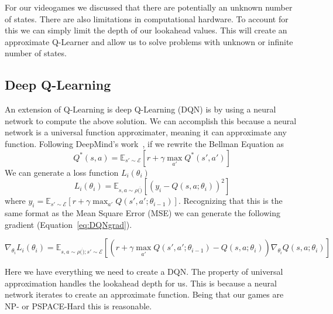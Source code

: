 For our videogames we discussed that there are potentially an unknown number
of states. There are also limitations in computational hardware. To account
for this we can simply limit the depth of our lookahead values. This will
create an approximate Q-Learner and allow us to solve problems with unknown
or infinite number of states. 

\subsection{Deep Q-Learning}
An extension of Q-Learning is deep Q-Learning (DQN) is by using a neural network 
to compute the above solution. We can accomplish this because a neural network 
is a universal function approximater, meaning it can approximate any function. 
Following DeepMind's work~\cite{DeepMind}, if we rewrite the Bellman Equation as
\begin{equation}
    Q^*(s,a) = \mathbb{E}_{s'\sim\mathcal{E}}\left[r + \gamma\max_{a'}Q^*(s',a')\right]
\end{equation}
We can generate a loss function $L_i(\theta_i)$
\begin{equation}
    L_i(\theta_i) = \mathbb{E}_{s,a\sim\rho(\dot)}\left[(y_i - Q(s,a;\theta_i))^2\right]
\end{equation}
where $y_i = \mathbb{E}_{s'\sim\mathcal{E}}\left[r + \gamma\max_{a'}Q(s',a';\theta_{i-1})\right]$. Recognizing that this is the same format as the Mean Square
Error (MSE) we can generate the following gradient (Equation~\ref{eq:DQNgrad}).

\begin{equation}
    \nabla_{\theta_i}L_i(\theta_i) = 
\mathbb{E}_{s,a\sim\rho(\dot);s'\sim\mathcal{E}}
\left[\left(r + \gamma\max_{a'}Q(s',a';\theta_{i-1}) - Q(s,a;\theta_i)\right) 
\nabla_{\theta_i}Q(s,a;\theta_i)\right]
\label{eq:DQNgrad}
\end{equation}

Here we have everything we need to create a DQN. The property of universal 
approximation handles the lookahead depth for us. This is because a
neural network iterates to create an approximate function. Being that our
games are NP- or PSPACE-Hard this is reasonable.

